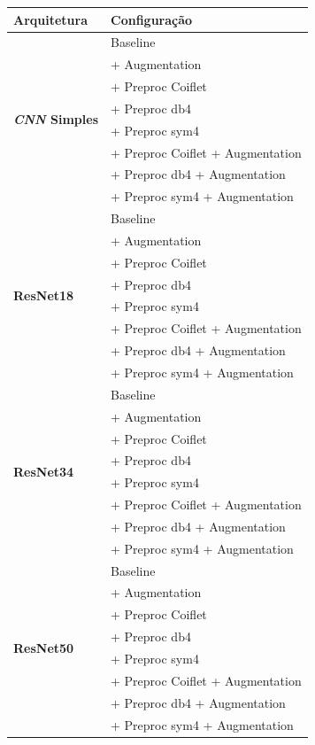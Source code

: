 \begin{quadro}[!ht]
\centering

\renewcommand{\arraystretch}{0.95}
\setlength{\tabcolsep}{5pt}

\caption{Cenários de Treinamento Considerados}
\begin{tabular}{|p{2.6cm}|l|}
\hline
\textbf{Arquitetura} & \textbf{Configuração} \\
\hline

\multirow{8}{=}{\textbf{\textit{CNN} Simples}}
    & Baseline \\
    & + Augmentation \\
    & + Preproc Coiflet \\
    & + Preproc db4 \\
    & + Preproc sym4 \\
    & + Preproc Coiflet + Augmentation \\
    & + Preproc db4 + Augmentation \\
    & + Preproc sym4 + Augmentation \\
\hline

\multirow{8}{=}{\textbf{ResNet18}}
    & Baseline \\
    & + Augmentation \\
    & + Preproc Coiflet \\
    & + Preproc db4 \\
    & + Preproc sym4 \\
    & + Preproc Coiflet + Augmentation \\
    & + Preproc db4 + Augmentation \\
    & + Preproc sym4 + Augmentation \\
\hline

\multirow{8}{=}{\textbf{ResNet34}}
    & Baseline \\
    & + Augmentation \\
    & + Preproc Coiflet \\
    & + Preproc db4 \\
    & + Preproc sym4 \\
    & + Preproc Coiflet + Augmentation \\
    & + Preproc db4 + Augmentation \\
    & + Preproc sym4 + Augmentation \\
\hline

\multirow{8}{=}{\textbf{ResNet50}}
    & Baseline \\
    & + Augmentation \\
    & + Preproc Coiflet \\
    & + Preproc db4 \\
    & + Preproc sym4 \\
    & + Preproc Coiflet + Augmentation \\
    & + Preproc db4 + Augmentation \\
    & + Preproc sym4 + Augmentation \\
\hline
\end{tabular}
\label{quad:planejamento_experimental}
\end{quadro}


